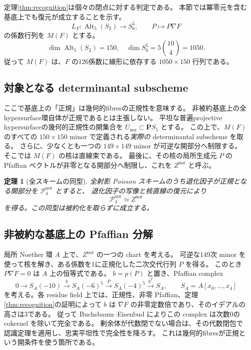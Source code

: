 \documentclass[11pt,a4paper]{ltjsarticle}
\newcommand{\PP}{\mathbf P}\renewcommand{\AA}{\mathbf A}
\newcommand{\cP}{\mathscr P_4}\newcommand{\dd}{\mathrm d}
\newtheorem{theorem}{定理}[section]
\theoremstyle{remark}\newtheorem{remark}[theorem]{注意}
\begin{document}
定理\ref{thm:recognition}は個々の閉点に対する判定である。
本節では冪零元を含む基底上でも復元が成立することを示す。
\[
 L_F:\operatorname{Alt}_5(S_2)\longrightarrow S_6^5,
 \qquad P\longmapsto P\nabla F
\]
の係数行列を $M(F)$ とする。
\[
        \dim\operatorname{Alt}_5(S_2)=150,
        \quad \dim S_6^5=5\binom{10}{4}=1050.
\]
従って $M(F)$ は、$F$ の126係数に線形に依存する $1050\times150$ 行列である。

\subsection{対象となる determinantal subscheme}

ここで基底上の「正規」は幾何的fibresの正規性を意味する。
非被約基底上の全hypersurface環自体が正規であるとは主張しない。
平坦な普遍projective hypersurfaceの幾何的正規性の開集合を $U_{\mathrm{nor}}\subset\PP S_5$ とする。
この上で、$M(F)$ のすべての $150\times150$ minor で定義される\emph{実際の} determinantal subscheme を取る。
さらに、少なくとも一つの $149\times149$ minor が可逆な開部分へ制限する。
そこでは $M(F)$ の核は直線束である。
最後に、その核の局所生成元 $P$ の Pfaffian ベクトルが非零となる開部分へ制限し、これを $Z^{\mathrm{nor}}$ と呼ぶ。

\begin{theorem}[全スキームの同型]\label{thm:normal-scheme}
全射影 Poisson スキームのうち退化因子が正規となる開部分を $\cP^{\mathrm{nor}}$ とすると、
退化因子の写像と核直線の復元により
\[
                    \cP^{\mathrm{nor}}\simeq Z^{\mathrm{nor}}
\]
を得る。この同型は被約化を取らずに成立する。
\end{theorem}

\subsection{非被約な基底上の Pfaffian 分解}

局所 Noether 環 $A$ 上で、$Z^{\mathrm{nor}}$ の一つの chart を考える。
可逆な149次 minor を使って核を解き、ある係数を1に正規化した二次交代行列 $P$ を得る。
このとき $P\nabla F=0$ は $A$ 上の恒等式である。
$b=p(P)$ と置き、Pfaffian complex
\begin{equation}\label{eq:relative-BE}
 0\longrightarrow S_A(-10)\xrightarrow{b}S_A(-6)^5
 \xrightarrow{P}S_A(-4)^5\xrightarrow{b^{\mathsf T}}S_A,
 \qquad S_A=A[x_0,\ldots,x_4]
\end{equation}
を考える。各 residue field 上では、正規性、非零 Pfaffian、定理\ref{thm:recognition}の証明によって
$b$ は $\nabla F$ の非零定数倍であり、そのイデアルの高さは3である。
従って Buchsbaum--Eisenbud によりこの complex は次数0の cokernel を除いて完全である。
剰余体が代数閉でない場合は、その代数閉包で認識定理を適用し、忠実平坦性で完全性を降ろす。
これは幾何的fibresが正規という開条件を使う箇所である。
\end{document}
